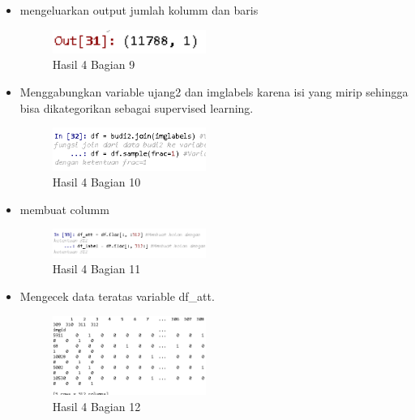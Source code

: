 \begin{itemize}
\item mengeluarkan output jumlah kolumm dan baris

\begin{figure}[H]
\centerline{\includegraphics[width=5cm]{figures/1174079/3/praktek11.PNG}}
\caption{Hasil 4 Bagian 9}
\label{labelgambar}
\end{figure}

\item Menggabungkan variable ujang2 dan imglabels karena isi yang mirip sehingga bisa dikategorikan sebagai supervised learning.

\begin{figure}[H]
\centerline{\includegraphics[width=5cm]{figures/1174079/3/praktek12.PNG}}
\caption{Hasil 4 Bagian 10}
\label{labelgambar}
\end{figure}

\item membuat columm

\begin{figure}[H]
\centerline{\includegraphics[width=5cm]{figures/1174079/3/praktek13.PNG}}
\caption{Hasil 4 Bagian 11}
\label{labelgambar}
\end{figure}

\item Mengecek data teratas variable df\_att.

\begin{figure}[H]
\centerline{\includegraphics[width=5cm]{figures/1174079/3/praktek14.PNG}}
\caption{Hasil 4 Bagian 12}
\label{labelgambar}
\end{figure}


\end{itemize}
